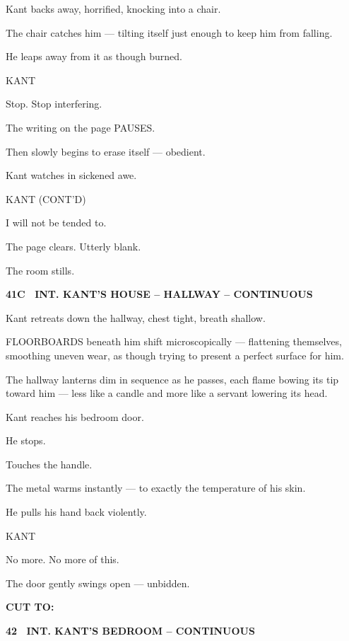 \documentclass[12pt]{article}
\newcommand{\scene}[2]{%
  \vspace{1.8\baselineskip}%
  \noindent\textbf{#1 \ #2}\par\vspace{0.4\baselineskip}%
}
\newenvironment{dialogue}[1]{%
  \vspace{0.8\baselineskip}%
  \noindent\hspace*{2.3in}\textsc{#1}\par%
  \noindent\hspace*{1.5in}\begin{minipage}[t]{4.5in}%
}{%
  \end{minipage}\par%
}
\newcommand{\transition}[1]{%
  \vspace{0.6\baselineskip}%
  \begin{flushright}\textbf{#1}\end{flushright}%
}
\begin{document}
Kant backs away, horrified, knocking into a chair.

The chair catches him —
tilting itself just enough to keep him from falling.

He leaps away from it as though burned.

\begin{dialogue}{KANT}
Stop.
Stop interfering.
\end{dialogue}

The writing on the page PAUSES.

Then slowly begins to erase itself —
obedient.

Kant watches in sickened awe.

\begin{dialogue}{KANT (CONT'D)}
I will not be tended to.
\end{dialogue}

The page clears.
Utterly blank.

The room stills.


\scene{41C}{INT. KANT'S HOUSE -- HALLWAY -- CONTINUOUS}

Kant retreats down the hallway, chest tight, breath shallow.

FLOORBOARDS beneath him shift microscopically —
flattening themselves, smoothing uneven wear,
as though trying to present a perfect surface for him.

The hallway lanterns dim in sequence as he passes,
each flame bowing its tip toward him —
less like a candle
and more like a servant lowering its head.

Kant reaches his bedroom door.

He stops.

Touches the handle.

The metal warms instantly —
to exactly the temperature of his skin.

He pulls his hand back violently.

\begin{dialogue}{KANT}
No more.
No more of this.
\end{dialogue}

The door gently swings open — unbidden.

\transition{CUT TO:}


\scene{42}{INT. KANT'S BEDROOM -- CONTINUOUS}
\end{document}

